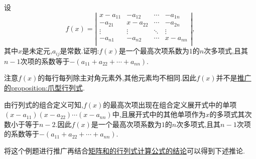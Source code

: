 \documentclass[../../main.tex]{subfiles}%
\begin{document}
\begin{example}\label{example:特征行列式写成多项式形式的系数}
设
\[
f(x)=\left| \begin{matrix}
x-a_{11}&		-a_{12}&		\cdots&		-a_{1n}\\
-a_{21}&		x-a_{22}&		\cdots&		-a_{2n}\\
\vdots&		\vdots&		\ddots&		\vdots\\
-a_{n1}&		-a_{n2}&		\cdots&		x-a_{nn}\\
\end{matrix} \right|,
\]
其中\(x\)是未定元,\(a_{ij}\)是常数.证明:\(f(x)\)是一个最高次项系数为\(1\)的\(n\)次多项式,且其\(n - 1\)次项的系数等于\(-(a_{11}+a_{22}+\cdots + a_{nn})\).
\end{example}
\begin{note}
注意$f(x)$的每行每列除主对角元素外,其他元素均不相同.因此$f(x)$并不是\hyperref[proposition:爪型行列式的推广]{推广的proposition:爪型行列式}.
\end{note}
\begin{solution}
由行列式的组合定义可知,\(f(x)\)的最高次项出现在组合定义展开式中的单项\((x - a_{11})(x - a_{22})\cdots(x - a_{nn})\)中,且展开式中的其他单项作为\(x\)的多项式其次数小于等于\(n - 2\).因此\(f(x)\)是一个最高次项系数为\(1\)的\(n\)次多项式,且其\(n - 1\)次项的系数等于\(-(a_{11}+a_{22}+\cdots + a_{nn})\).

\end{solution}
\begin{remark}
将这个例题进行推广再结合\hyperref[proposition:矩阵和的行列式计算公式]{矩阵和的行列式计算公式的结论}可以得到下述推论.
\end{remark}
\end{document}

